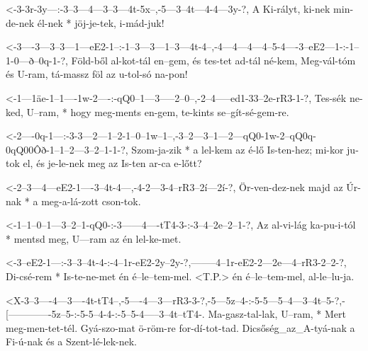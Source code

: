 

  {<-3-3r-3y---:-3--3---4---3--3---4t-5x--,-5---3--4t---4-4---3y-?,}
  {  A Ki-rályt, ki-nek min-de-nek él-nek * jöj-je-tek, i-mád-juk!}


  {<-3----3---3--3---1---eE2-1--:-1--3---3---1--3---4t-4--,-4---4---4---4--5-4----3--eE2---1-:-1--1-0---ð--0q-1-?,}
  {  Föld-ből al-kot-tál en--gem, és tes-tet ad-tál né-kem, Meg-vál-tóm és U-ram, tá-massz föl az u-tol-só na-pon!}

  {<-1---1äe-1--1----1w-2----:-qQ0--1---3-----2--0--,-2--4-----ed1-33--2e-rR3-1-?,}
  {  Tes-sék ne-ked, U--ram, * hogy meg-ments en-gem, te-kints se--gít-sé-gem-re.}

  {<-2----0q-1---:-3-3---2---1--2-1--0--1w--1--,-3--2---3--1---2---qQ0-1w-2--qQ0q-0qQ00Ôð-1--1--2---3--2--1-1-?,}
  {  Szom-ja-zik * a lel-kem az é-lő Is-ten-hez; mi-kor ju-tok el, és  je-le-nek  meg     az Is-ten ar-ca e-lőtt? }


  {<-2--3---4---eE2-1----3--4t-4---,-4-2---3-4--rR3--2í---2í-?,}
  {  Ör-ven-dez-nek majd az Úr-nak * a meg-a-lá-zott cson-tok.}

  {<-1--1--0--1---3--2--1-qQ0-:-3------4----tT4-3-:-3--4--2e--2--1-?,}
  {  Az al-vi-lág ka-pu-i-tól * mentsd meg, U---ram az én lel-ke-met.}

  {<-3--eE2-1---:-3--3--4t-4-:-4--1r-eE2-2y--2y-?,--------4--1r-eE2-2---2e---4--rR3-2--2-?,}
  {  Di-csé-rem * Is-te-ne-met én é--le--tem-mel.  <T.P.> én é--le--tem-mel, al-le--lu-ja.}

  {<X-3--3----4---3----4t-tT4--,-5----4---3---rR3-3-?,-5---5z--4-:-5-5---5--4---3--4t--5-?,-[-------------5z--5-:-5-5--4-4-:-5--5-4-----3--4t--tT4-.}
  {   Ma-gasz-tal-lak, U--ram, * Mert meg-men-tet-tél. Gyá-szo-mat ö-röm-re for-dí-tot-tad. Dicsőség_az_A-tyá-nak a Fi-ú-nak és a Szent-lé-lek-nek.}

